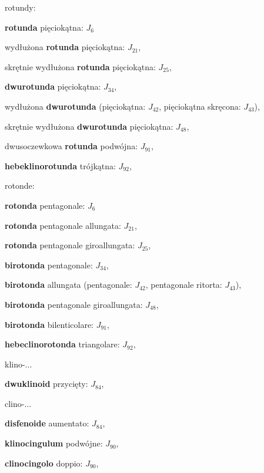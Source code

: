 \begin{compactitem}
\begin{compactitem}
\begin{compactitem}
\begin{compactitem}
    \item rotundy: \begin{compactitem} %
        \item \textbf{rotunda} pięciokątna: $J_6$ %
        \item wydłużona \textbf{rotunda} pięciokątna: $J_{21}$, %
        \item skrętnie wydłużona \textbf{rotunda} pięciokątna: $J_{25}$, %
        \item \textbf{dwurotunda} pięciokątna: $J_{34}$, %
        \item wydłużona \textbf{dwurotunda} (pięciokątna: $J_{42}$, pięciokątna skręcona: $J_{43}$), %
        \item skrętnie wydłużona \textbf{dwurotunda} pięciokątna: $J_{48}$, %
        \item dwusoczewkowa \textbf{rotunda} podwójna: $J_{91}$, %
        \item \textbf{hebeklinorotunda} trójkątna: $J_{92}$, %
    \item rotonde: \begin{compactitem} %
        \item \textbf{rotonda} pentagonale: $J_6$ %
        \item \textbf{rotonda} pentagonale allungata: $J_{21}$, %
        \item \textbf{rotonda} pentagonale giroallungata: $J_{25}$, %
        \item \textbf{birotonda} pentagonale: $J_{34}$, %
        \item \textbf{birotonda} allungata (pentagonale: $J_{42}$, pentagonale ritorta: $J_{43}$), %
        \item \textbf{birotonda} pentagonale giroallungata: $J_{48}$, %
        \item \textbf{birotonda} bilenticolare: $J_{91}$, %
        \item \textbf{hebeclinorotonda} triangolare: $J_{92}$, %
    \end{compactitem}

    \item klino-... \begin{compactitem} %
        \item \textbf{dwuklinoid} przycięty: $J_{84}$, %
    \item clino-... \begin{compactitem} %
        \item \textbf{disfenoide} aumentato: $J_{84}$, %
        \item \textbf{klinocingulum} podwójne: $J_{90}$, %
        \item \textbf{clinocingolo} doppio: $J_{90}$, %
    \end{compactitem}


\end{compactitem}
\end{compactitem}
\end{compactitem}
\end{compactitem}
\end{compactitem}
\end{compactitem}
